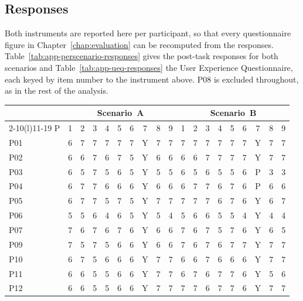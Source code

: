 \FloatBarrier

\subsection{Responses}
\label{app:eval-responses}

Both instruments are reported here per participant, so that every questionnaire figure in Chapter~\ref{chap:evaluation} can be recomputed from the responses. Table~\ref{tab:app-perscenario-responses} gives the post-task responses for both scenarios and Table~\ref{tab:app-ueq-responses} the User Experience Questionnaire, each keyed by item number to the instrument above. P08 is excluded throughout, as in the rest of the analysis.

\begin{table}[htpb]
    \centering
    \footnotesize
    \setlength{\tabcolsep}{3pt}
    \begin{tabular}{l*{6}{c}ccc@{\hskip 1.2em}*{6}{c}ccc}
        \toprule
        & \multicolumn{9}{c}{Scenario~A} & \multicolumn{9}{c}{Scenario~B} \\
        \cmidrule(r){2-10}\cmidrule(l){11-19}
        P & 1 & 2 & 3 & 4 & 5 & 6 & 7 & 8 & 9 & 1 & 2 & 3 & 4 & 5 & 6 & 7 & 8 & 9 \\
        \midrule
        P01 & 6 & 7 & 7 & 7 & 7 & 7 & Y & 7 & 7 & 7 & 7 & 7 & 7 & 7 & 7 & Y & 7 & 7 \\
        P02 & 6 & 6 & 7 & 6 & 7 & 5 & Y & 6 & 6 & 6 & 6 & 7 & 7 & 7 & 7 & Y & 7 & 7 \\
        P03 & 6 & 5 & 7 & 5 & 6 & 5 & Y & 5 & 5 & 6 & 5 & 6 & 5 & 5 & 6 & P & 3 & 3 \\
        P04 & 6 & 7 & 7 & 6 & 6 & 6 & Y & 6 & 6 & 6 & 7 & 7 & 6 & 7 & 6 & P & 6 & 6 \\
        P05 & 6 & 7 & 7 & 5 & 7 & 5 & Y & 7 & 7 & 7 & 7 & 7 & 6 & 7 & 6 & Y & 6 & 7 \\
        P06 & 5 & 5 & 6 & 4 & 6 & 5 & Y & 5 & 4 & 5 & 6 & 6 & 5 & 5 & 4 & Y & 4 & 4 \\
        P07 & 7 & 6 & 7 & 6 & 7 & 6 & Y & 6 & 6 & 7 & 6 & 7 & 5 & 7 & 6 & Y & 6 & 5 \\
        P09 & 7 & 5 & 7 & 5 & 6 & 6 & Y & 6 & 6 & 7 & 6 & 7 & 6 & 7 & 7 & Y & 7 & 7 \\
        P10 & 6 & 7 & 5 & 6 & 6 & 6 & Y & 7 & 7 & 6 & 6 & 7 & 6 & 6 & 6 & Y & 7 & 7 \\
        P11 & 6 & 6 & 5 & 5 & 6 & 6 & Y & 7 & 7 & 6 & 7 & 6 & 7 & 7 & 6 & Y & 5 & 6 \\
        P12 & 6 & 6 & 5 & 5 & 6 & 6 & Y & 7 & 7 & 7 & 7 & 6 & 7 & 7 & 6 & Y & 7 & 7 \\

\end{tabular}
\end{table}
